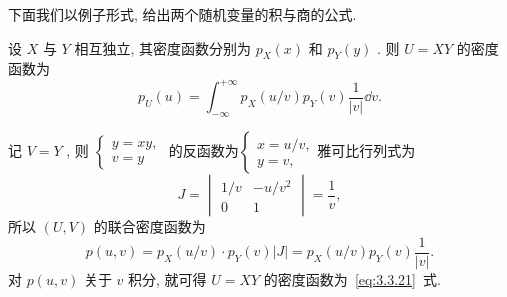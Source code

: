         下面我们以例子形式, 给出两个随机变量的积与商的公式.
      \begin{example}[(积的公式)]\label{exam:3.3.10}
      	设 $X$ 与 $Y$ 相互独立, 其密度函数分别为 $p_{X}(x)$ 和 $p_{Y}(y)$ . 则 $U=XY$ 的密度函数为
      	\begin{equation}\label{eq:3.3.21}
      		p_{U}(u)=\int_{-\infty}^{+\infty}p_{X}(u/v)p_{Y}(v)\frac{1}{|v|}\dd v.
      	\end{equation}
      	\begin{solution}
      		记 $V=Y$ , 则 $\begin{cases}
      		y=xy,\\
      		v=y
      		\end{cases}$ 的反函数为$\begin{cases}
      		x=u/v,\\
      		y=v,
      		\end{cases}$雅可比行列式为
      		\begin{equation*}
      			J=\begin{vmatrix}
      			1/v & -u/v^2\\
      			0 & 1
      			\end{vmatrix}=\frac{1}{v},
      		\end{equation*}
      		所以 $(U,V)$ 的联合密度函数为
      		\begin{equation*}
      			p(u,v)=p_{X}(u/v)\cdot p_{Y}(v)|J|=p_{X}(u/v)p_{Y}(v)\frac{1}{|v|}.
      		\end{equation*}
      		对 $p(u,v)$ 关于 $v$ 积分, 就可得 $U=XY$ 的密度函数为~\eqref{eq:3.3.21}~式.
      	\end{solution}
      \end{example}
